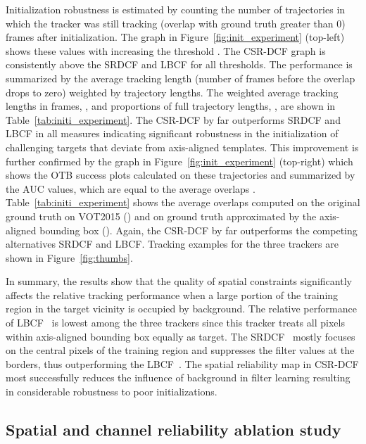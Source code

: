 \documentclass[twocolumn]{article}
\begin{document}
Initialization robustness is estimated by counting the number of trajectories in which the tracker was still tracking (overlap with ground truth greater than 0)  frames after initialization. The graph in Figure~\ref{fig:init_experiment} (top-left) shows these values with increasing the threshold . The CSR-DCF graph is consistently above the SRDCF and LBCF for all thresholds. The performance is summarized by the average tracking length (number of frames before the overlap drops to zero) weighted by trajectory lengths. The weighted average tracking lengths in frames, , and proportions of full trajectory lengths, , are shown in Table~\ref{tab:initi_experiment}. The CSR-DCF by far outperforms SRDCF and LBCF in all measures indicating significant robustness in the initialization of challenging targets that deviate from axis-aligned templates. 
This improvement is further confirmed by the graph in Figure~\ref{fig:init_experiment} (top-right) which shows the OTB success plots \citep{otb_cvpr2010} calculated on these trajectories and summarized by the AUC values, which are equal to the average overlaps \citep{cehovin_tip2016}. Table~\ref{tab:initi_experiment} shows the average overlaps computed on the original ground truth on VOT2015 () and on ground truth approximated by the axis-aligned bounding box (). Again, the CSR-DCF by far outperforms the competing alternatives SRDCF and LBCF. Tracking examples for the three trackers are shown in Figure~\ref{fig:thumbs}.

In summary, the results show that the quality of spatial constraints significantly affects the relative tracking performance when a large portion of the training region in the target vicinity is occupied by background. The relative performance of LBCF~\citep{cfwlb_cvpr2015} is lowest among the three trackers since this tracker treats all pixels within axis-aligned bounding box equally as target. The SRDCF~\citep{srdcf_iccv2015} mostly focuses on the central pixels of the training region and suppresses the filter values at the borders, thus outperforming the LBCF~\citep{cfwlb_cvpr2015}. The spatial reliability map in CSR-DCF most successfully reduces the influence of background in filter learning resulting in considerable robustness to poor initializations.

\subsection{Spatial and channel reliability ablation study} \label{sec:ablation}
\end{document}
